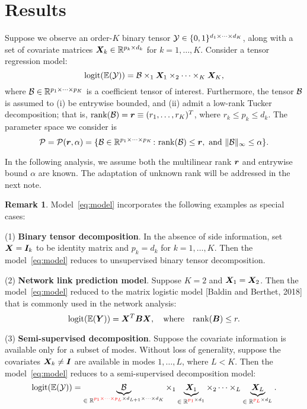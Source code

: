 \documentclass[11pt]{article}
\theoremstyle{plain}
\theoremstyle{definition}
\newtheorem{rmk}{Remark}
\newcommand*{\KeepStyleUnderBrace}[1]{%
  \mathop{%
    \mathchoice
    {\underbrace{\displaystyle#1}}%
    {\underbrace{\textstyle#1}}%
    {\underbrace{\scriptstyle#1}}%
    {\underbrace{\scriptscriptstyle#1}}%
  }\limits
}
\begin{document}
\section{Results}
Suppose we observe an order-$K$ binary tensor $\mathcal{Y}\in\{0,1\}^{d_1\times \cdots \times d_K}$, along with a set of covariate matrices $\bm X_k\in\mathbb{R}^{p_k\times d_k}$ for $k=1,\ldots,K$. Consider a tensor regression model:
\begin{equation}\label{eq:model}
\text{logit}(\mathbb{E}(\mathcal{Y}))=\mathcal{B}\times_1\bm X_1\times_2\cdots\times_K \bm X_K,
\end{equation}
where $\mathcal{B}\in \mathbb{R}^{p_1\times \cdots \times p_K}$ is a coefficient tensor of interest. Furthermore, the tensor $\mathcal{B}$ is assumed to (i) be entrywise bounded,  and (ii) admit a low-rank Tucker decomposition; that is, $\text{rank}(\mathcal{B})=\bm{r}\equiv(r_1,\ldots,r_K)^T$, where $r_k\leq p_k\leq d_k$. The parameter space we consider is
\[
\mathcal{P}=\mathcal{P}(\bm{r},\alpha)=\{ \mathcal{B} \in \mathbb{R}^{p_1\times \cdots \times p_K}\colon \text{rank}(\mathcal{B})\leq \bm{r}, \ \text{and} \ \lVert\mathcal{B}\rVert_\infty\leq \alpha\}.
\]

In the following analysis, we assume both the multilinear rank $\bm{r}$ and entrywise bound $\alpha$ are known. The adaptation of unknown rank will be addressed in the next note. 

\begin{rmk}
Model~\eqref{eq:model} incorporates the following examples as special cases:

(1) {\bf Binary tensor decomposition}. In the absence of side information, set $\bm X=\bm I_k$ to be identity matrix and $p_k=d_k$ for $k=1,\ldots,K$. Then the model~\eqref{eq:model} reduces to unsupervised binary tensor decomposition.

(2) {\bf Network link prediction model}. Suppose $K=2$ and $\bm X_1=\bm X_2$. Then the model~\eqref{eq:model} reduced to the matrix logistic model [Baldin and Berthet, 2018] that is commonly used in the network analysis:
\[
\text{logit}(\mathbb{E}(\bm Y))=\bm X^T\bm B\bm X,\quad \text{where}\quad \text{rank}(\bm B)\leq r. 
\]

(3) {\bf Semi-supervised decomposition}. Suppose the covariate information is available only for a subset of modes. Without loss of generality, suppose the covariates $\bm X_k\neq \bm I$ are available in modes $1,\ldots,L$, where $L< K$. Then the model~\eqref{eq:model} reduces to a semi-supervised decomposition model:
\[
\text{logit}(\mathbb{E}(\tY))=\KeepStyleUnderBrace{\tB}_{\text{$\in\mathbb{R}^{{\color{red}p_1\times \cdots\times p_L}\times d_{L+1}\times \cdots \times  d_K}$}} \times_1 \KeepStyleUnderBrace{\mX_1}_{\text{$\in \mathbb{R}^{{\color{red}p_1}\times d_1}$}}\times_2\cdots\times_L\KeepStyleUnderBrace{\mX_L}_{\text{$\in \mathbb{R}^{{\color{red}p_L}\times d_L}$}}.
\] 
\end{rmk}
\end{document}
